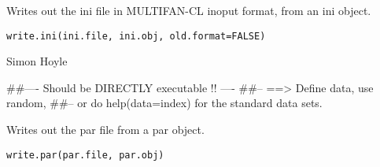 \documentclass[a4paper]{book}
\begin{document}
%
\begin{Description}\relax

Writes out the ini file in MULTIFAN-CL inoput format, from an ini object. 
\end{Description}
%
\begin{Usage}
\begin{verbatim}
write.ini(ini.file, ini.obj, old.format=FALSE)
\end{verbatim}
\end{Usage}
%
\begin{Arguments}
\begin{ldescription}
\item[\code{ini.file}] 


\item[\code{ini.obj}] 


\item[\code{old.format}] 


\end{ldescription}
\end{Arguments}
%
\begin{Author}\relax

Simon Hoyle
\end{Author}
%
\begin{Examples}
\begin{ExampleCode}
##---- Should be DIRECTLY executable !! ----
##-- ==>  Define data, use random,
##--	or do  help(data=index)  for the standard data sets.

\end{ExampleCode}
\end{Examples}
%
\begin{Description}\relax

Writes out the par file from a par object. 
\end{Description}
%
\begin{Usage}
\begin{verbatim}
write.par(par.file, par.obj)
\end{verbatim}
\end{Usage}
%
\begin{Arguments}
\begin{ldescription}
\item[\code{par.file}] 


\item[\code{par.obj}] 


\end{ldescription}
\end{Arguments}
\end{document}
